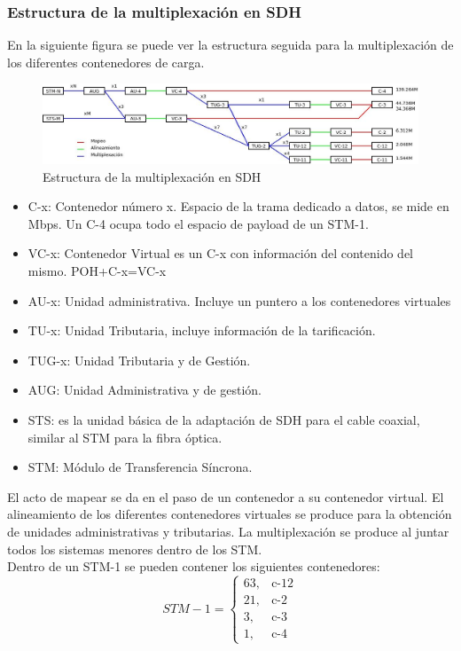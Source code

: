 \subsubsection{Estructura de la multiplexación en \acrshort{SDH}}
En la siguiente figura se puede ver la estructura seguida para la multiplexación de los diferentes contenedores de carga.
\begin{figure}[H]
\centering
\includegraphics[width=\textwidth]{Imagen/diamuxSDH.jpg}
\caption{Estructura de la multiplexación en \acrshort{SDH}}
\end{figure}
\begin{itemize}
	\item C-x: Contenedor número x. Espacio de la trama dedicado a datos, se mide en Mbps. Un C-4 ocupa todo el espacio de payload de un STM-1.
	\item VC-x: Contenedor Virtual es un C-x con información del contenido del mismo. POH+C-x=VC-x
	\item AU-x: Unidad administrativa. Incluye un puntero a los contenedores virtuales
	\item TU-x: Unidad Tributaria, incluye información de la tarificación.
	\item TUG-x: Unidad Tributaria y de Gestión.
	\item AUG: Unidad Administrativa y de gestión.
	\item STS: es la unidad básica de la adaptación de SDH para el cable coaxial, similar al STM para la fibra óptica.
	\item STM: Módulo de Transferencia Síncrona.
\end{itemize}
El acto de mapear se da en el paso de un contenedor a su contenedor virtual. El alineamiento de los diferentes contenedores virtuales se produce para la obtención de unidades administrativas y tributarias. La multiplexación se produce al juntar todos los sistemas menores dentro de los \acrshort{STM}.\\
Dentro de un \acrshort{STM}-1 se pueden contener los siguientes contenedores:
\[STM-1=
\begin{cases}
63, & \text{c-12}\\
21, & \text{c-2}\\
3, & \text{c-3}\\
1, & \text{c-4}
\end{cases}
\]
